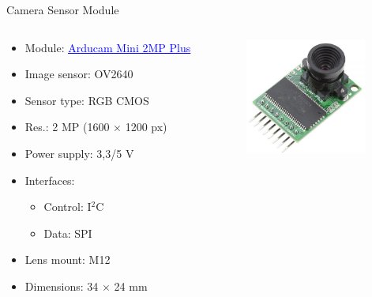 \begin{frame}{Camera Sensor Module}

    \begin{columns}[t]
        \begin{column}[t]{0.6\textwidth}
            \begin{itemize}
                \item Module: \href{https://www.arducam.com/product/arducam-2mp-spi-camera-b0067-arduino/}{\textcolor{blue}{\underline{Arducam Mini 2MP Plus}}}
                \item Image sensor: OV2640
                \item Sensor type: RGB CMOS
                \item Res.: 2 MP (1600 $\times$ 1200 px)
                \item Power supply: 3,3/5 V
                \item Interfaces:
                    \begin{itemize}
                        \item Control: I$^{2}$C
                        \item Data: SPI
                    \end{itemize}
                \item Lens mount: M12
                \item Dimensions: 34 $\times$ 24 mm
            \end{itemize}
        \end{column}
        \begin{column}[t]{0.4\textwidth}
            \vspace{1cm}
            \begin{figure}[!ht]
                \begin{center}
                    \includegraphics[width=4cm]{figures/arducam-2mp}
                \end{center}
            \end{figure}
        \end{column}
    \end{columns}

\end{frame}

